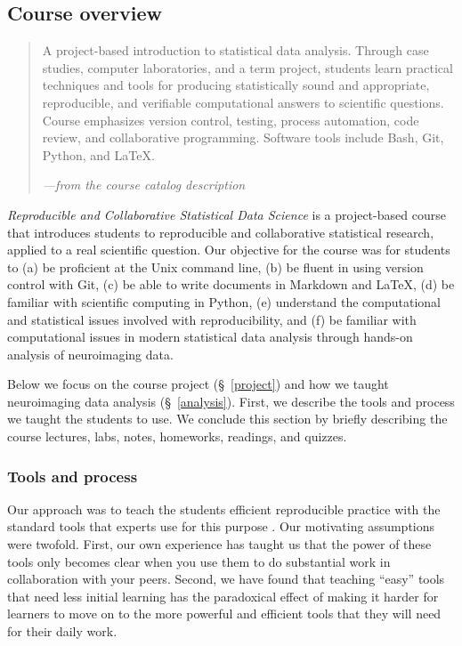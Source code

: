 \subsection{Course overview}

\begin{quote}
A project-based introduction to statistical data analysis. Through case
studies, computer laboratories, and a term project, students learn
practical techniques and tools for producing statistically sound and
appropriate, reproducible, and verifiable computational answers to
scientific questions. Course emphasizes version control, testing,
process automation, code review, and collaborative programming.
Software tools include Bash, Git, Python, and \LaTeX.

\hfill\emph{---from the course catalog description}
\end{quote}

\emph{Reproducible and Collaborative Statistical Data Science} is a
project-based course that introduces students to reproducible and collaborative
statistical research, applied to a real scientific question.
Our objective for the course was for students to
(a) be proficient at the Unix command line,
(b) be fluent in using version control with Git,
(c) be able to write documents in Markdown and \LaTeX,
(d) be familiar with scientific computing in Python,
(e) understand the computational and statistical issues involved with reproducibility, and
(f) be familiar with computational issues in modern statistical data
analysis through hands-on analysis of neuroimaging data.

Below we focus on the course project (\S~\ref{project}) and
how we taught neuroimaging data analysis (\S~\ref{analysis}).
First, we describe the tools and process we taught the students to use.
We conclude this section by briefly describing the course
lectures, labs, notes, homeworks, readings, and quizzes.

\subsubsection{Tools and process}

Our approach was to teach the students efficient reproducible practice with
the standard tools that experts use for this purpose
\citep{millman2014developing}. Our motivating assumptions were twofold.
First, our own experience has taught us that the power of these tools only
becomes clear when you use them to do substantial work in collaboration with
your peers.  Second, we have found that teaching ``easy'' tools that need less
initial learning has the paradoxical effect of making it harder for learners
to move on to the more powerful and efficient tools that they will need for
their daily work.

